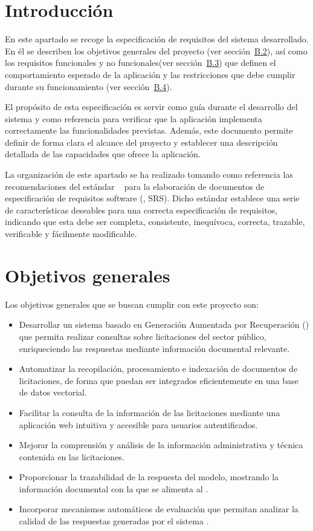 
\section{Introducción}

En este apartado se recoge la especificación de requisitos del sistema desarrollado. En él se describen los objetivos generales del proyecto (ver sección~\hyperref[req:objgen]{B.2}), así como los requisitos funcionales y no funcionales(ver sección~\hyperref[req:req]{B.3}) que definen el comportamiento esperado de la aplicación y las restricciones que debe cumplir durante su funcionamiento (ver sección~\hyperref[req:esp]{B.4}).

El propósito de esta especificación es servir como guía durante el desarrollo del sistema y como referencia para verificar que la aplicación implementa correctamente las funcionalidades previstas. Además, este documento permite definir de forma clara el alcance del proyecto y establecer una descripción detallada de las capacidades que ofrece la aplicación.

La organización de este apartado se ha realizado tomando como referencia las recomendaciones del estándar ~\cite{req:ieee} para la elaboración de documentos de especificación de requisitos software (, SRS). Dicho estándar establece una serie de características deseables para una correcta especificación de requisitos, indicando que esta debe ser completa, consistente, inequívoca, correcta, trazable, verificable y fácilmente modificable.

\section{Objetivos generales} \label{req:objgen}

Los objetivos generales que se buscan cumplir con este proyecto son:
\begin{itemize}
\tightlist
	\item Desarrollar un sistema basado en Generación Aumentada por Recuperación () que permita realizar consultas sobre licitaciones del sector público, enriqueciendo las respuestas mediante información documental relevante.
	\item Automatizar la recopilación, procesamiento e indexación de documentos de licitaciones, de forma que puedan ser integrados eficientemente en una base de datos vectorial.
	\item Facilitar la consulta de la información de las licitaciones mediante una aplicación web intuitiva y accesible para usuarios autentificados.
	\item Mejorar la comprensión y análisis de la información administrativa y técnica contenida en las licitaciones.
	\item Proporcionar la trazabilidad de la respuesta del modelo, mostrando la información documental con la que se alimenta al . 
	\item Incorporar mecanismos automáticos de evaluación que permitan analizar la calidad de las respuestas generadas por el sistema .
\end{itemize}

